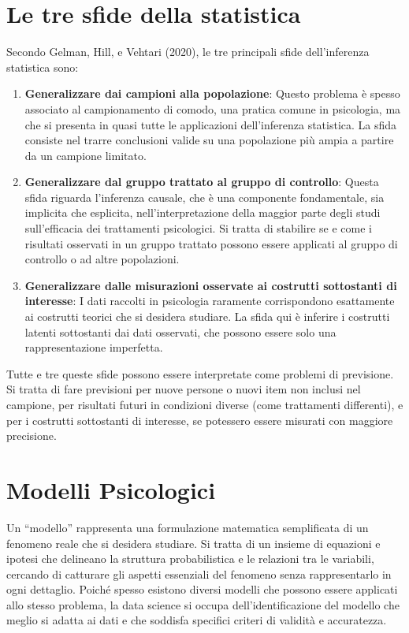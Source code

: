 \documentclass[
  letterpaper,
  krantz2]{{[}./krantz{]}}
\begin{document}
\section{Le tre sfide della
statistica}\label{le-tre-sfide-della-statistica}

Secondo Gelman, Hill, e Vehtari (2020), le tre principali sfide
dell'inferenza statistica sono:

\begin{enumerate}
\def\labelenumi{\arabic{enumi}.}
\item
  \textbf{Generalizzare dai campioni alla popolazione}: Questo problema
  è spesso associato al campionamento di comodo, una pratica comune in
  psicologia, ma che si presenta in quasi tutte le applicazioni
  dell'inferenza statistica. La sfida consiste nel trarre conclusioni
  valide su una popolazione più ampia a partire da un campione limitato.
\item
  \textbf{Generalizzare dal gruppo trattato al gruppo di controllo}:
  Questa sfida riguarda l'inferenza causale, che è una componente
  fondamentale, sia implicita che esplicita, nell'interpretazione della
  maggior parte degli studi sull'efficacia dei trattamenti psicologici.
  Si tratta di stabilire se e come i risultati osservati in un gruppo
  trattato possono essere applicati al gruppo di controllo o ad altre
  popolazioni.
\item
  \textbf{Generalizzare dalle misurazioni osservate ai costrutti
  sottostanti di interesse}: I dati raccolti in psicologia raramente
  corrispondono esattamente ai costrutti teorici che si desidera
  studiare. La sfida qui è inferire i costrutti latenti sottostanti dai
  dati osservati, che possono essere solo una rappresentazione
  imperfetta.
\end{enumerate}

Tutte e tre queste sfide possono essere interpretate come problemi di
previsione. Si tratta di fare previsioni per nuove persone o nuovi item
non inclusi nel campione, per risultati futuri in condizioni diverse
(come trattamenti differenti), e per i costrutti sottostanti di
interesse, se potessero essere misurati con maggiore precisione.

\section{Modelli Psicologici}\label{modelli-psicologici}

Un ``modello'' rappresenta una formulazione matematica semplificata di
un fenomeno reale che si desidera studiare. Si tratta di un insieme di
equazioni e ipotesi che delineano la struttura probabilistica e le
relazioni tra le variabili, cercando di catturare gli aspetti essenziali
del fenomeno senza rappresentarlo in ogni dettaglio. Poiché spesso
esistono diversi modelli che possono essere applicati allo stesso
problema, la data science si occupa dell'identificazione del modello che
meglio si adatta ai dati e che soddisfa specifici criteri di validità e
accuratezza.
\end{document}
